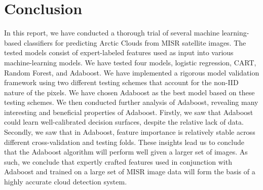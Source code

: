 \documentclass[11pt, letterpaper, journal]{IEEEtran}
\begin{document}
\section{Conclusion}
In this report, we have conducted a thorough trial of several machine learning-based classifiers for predicting Arctic Clouds from MISR satellite images. The tested models consist of expert-labeled features used as input into various machine-learning models. We have tested four models, logistic regression, CART, Random Forest, and Adaboost. We have implemented a rigorous model validation framework using two different testing schemes that account for the non-IID nature of the pixels. We have chosen Adaboost as the best model based on these testing schemes. We then conducted further analysis of Adaboost, revealing many interesting and beneficial properties of Adaboost. Firstly, we saw that Adaboost could learn well-calibrated decision surfaces, despite the relative lack of data. Secondly, we saw that in Adaboost, feature importance is relatively stable across different cross-validation and testing folds. These insights lead us to conclude that the Adaboost algorithm will perform well given a larger set of images. As such, we conclude that expertly crafted features used in conjunction with Adaboost and trained on a large set of MISR image data will form the basis of a highly accurate cloud detection system.
\end{document}
